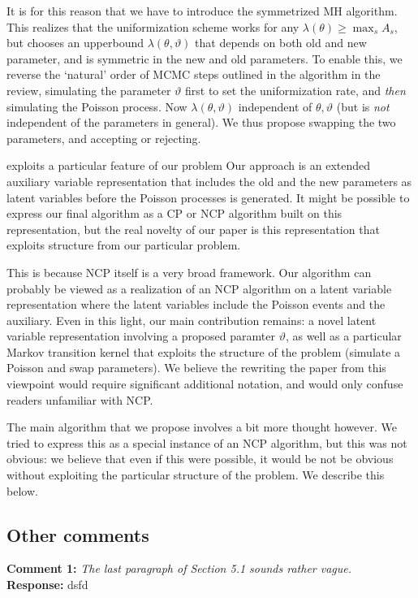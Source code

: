 \documentclass[11pt]{article}
\newcommand{\rev}[2]{\textbf{Comment #1: }\emph{#2}}
\newcommand{\resp}{\textbf{Response: }}
\begin{document}
It is for this reason that we have to introduce the symmetrized MH algorithm. 
This realizes that the uniformization scheme works for any $\lambda(\theta) \ge \max_s A_s$, but chooses an upperbound $\lambda(\theta, \vartheta)$ that depends on both old and new parameter, and is symmetric in the new and old parameters. 
To enable this, we reverse the `natural' order of MCMC steps outlined in the algorithm in the review, simulating the parameter $\vartheta$ first to set the uniformization rate, and \emph{then} simulating the Poisson process. 
Now $\lambda(\theta,\vartheta)$ independent of $\theta,\vartheta$ (but is \emph{not} independent of the parameters in general).
We thus propose swapping the two parameters, and accepting or rejecting.

exploits a particular feature of our problem
Our approach is an extended auxiliary variable representation that includes the old and the new parameters as latent variables before 
the Poisson processes is generated. 
It might be possible to express our final algorithm as a CP or NCP algorithm built on this representation, 
but the real novelty of our paper is this representation that exploits structure from our particular problem.

This is because NCP itself is a very broad framework. 
Our algorithm can probably be viewed as a realization of an NCP algorithm on a latent variable representation where the latent variables include the Poisson events and the auxiliary. 
Even in this light, our main contribution remains: a novel latent variable representation involving a proposed paramter $\vartheta$, as well as a particular Markov transition kernel that exploits the structure of the problem (simulate a Poisson and swap parameters). We believe the rewriting the paper from this viewpoint would require significant additional notation, and would only confuse readers unfamiliar with NCP.

The main algorithm that we propose involves a bit more thought however. We tried to express this as a special instance of an NCP algorithm, but this was not obvious: we believe that even if this were possible, it would be not be obvious without exploiting the particular structure of the problem. We describe this below.

\subsection*{Other comments}
\rev{1}{The last paragraph of Section 5.1 sounds rather vague.} \\ 
\resp dsfd 
\end{document}

